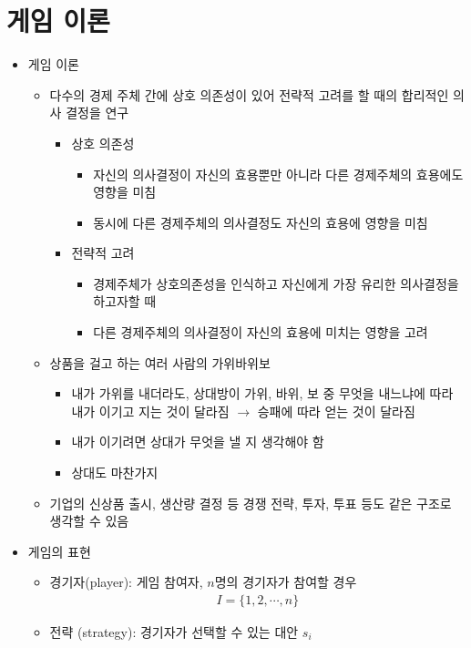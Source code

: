 \section{게임 이론}
\begin{itemize}
\item 게임 이론
	\begin{itemize}
	\item 다수의 경제 주체 간에 상호 의존성이 있어 전략적 고려를 할 때의 합리적인 의사 결정을 연구
		\begin{itemize}
		\item 상호 의존성
			\begin{itemize}
			\item 자신의 의사결정이 자신의 효용뿐만 아니라 다른 경제주체의 효용에도 영향을 미침
			\item 동시에 다른 경제주체의 의사결정도 자신의 효용에 영향을 미침
			\end{itemize}
		\item 전략적 고려
			\begin{itemize}
			\item 경제주체가 상호의존성을 인식하고 자신에게 가장 유리한 의사결정을 하고자할 때
			\item 다른 경제주체의 의사결정이 자신의 효용에 미치는 영향을 고려
			\end{itemize}
		\end{itemize}
	\item 상품을 걸고 하는 여러 사람의 가위바위보
		\begin{itemize}
		\item 내가 가위를 내더라도, 상대방이 가위, 바위, 보 중 무엇을 내느냐에 따라 내가 이기고 지는 것이 달라짐 $\rightarrow$ 승패에 따라 얻는 것이 달라짐
		\item 내가 이기려면 상대가 무엇을 낼 지 생각해야 함 
		\item 상대도 마찬가지 
		\end{itemize}
	\item 기업의 신상품 출시, 생산량 결정 등 경쟁 전략, 투자, 투표 등도 같은 구조로 생각할 수 있음
	\end{itemize}
\item 게임의 표현
	\begin{itemize}
	\item 경기자(player): 게임 참여자, $n$명의 경기자가 참여할 경우
		\begin{align*}
		I = \{1, 2, \cdots, n \}
		\end{align*}
	\item 전략 (strategy): 경기자가 선택할 수 있는 대안 $s_{i}$

\end{itemize}
\end{itemize}
